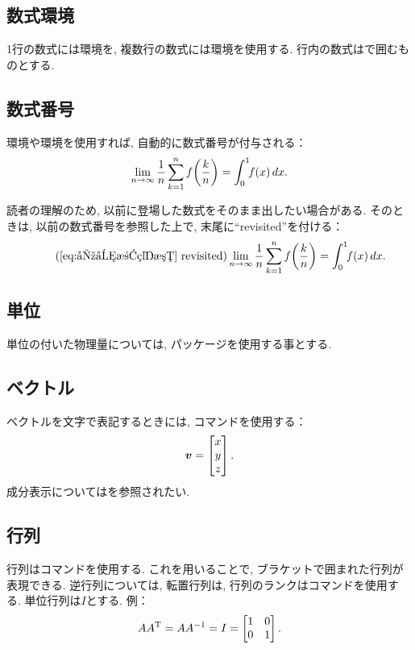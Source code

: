 \documentclass[uplatex,a4j,twocolumn]{jsarticle}
\begin{document}
	\subsection{数式環境}
		1行の数式には環境を, 複数行の数式には環境を使用する. 行内の数式は\code{\$}で囲むものとする.
	\subsection{数式番号}
		環境や環境を使用すれば, 自動的に数式番号が付与される：
		\begin{equation}\label{eq:区分求積法}
			\lim\limits_{n\to\infty}{\frac{1}{n} \sum_{k=1}^{n}{f\pr{\frac{k}{n}}}} = \dint{x}{0}{1}{f\pr{x}}.
		\end{equation}
		
		読者の理解のため, 以前に登場した数式をそのまま出したい場合がある. そのときは, 以前の数式番号を参照した上で, 末尾に``revisited''を付ける：
		\begin{equation}\tag{\ref{eq:区分求積法} revisited}
			\lim\limits_{n\to\infty}{\frac{1}{n} \sum_{k=1}^{n}{f\pr{\frac{k}{n}}}} = \dint{x}{0}{1}{f\pr{x}}.
		\end{equation}
	\subsection{単位}
		単位の付いた物理量については, パッケージを使用する事とする.
	\subsection{ベクトル}
		ベクトルを文字で表記するときには, コマンドを使用する：
		\begin{equation}
			\bm{v} = \batrix{x \\ y \\ z}.
		\end{equation}
		成分表示についてはを参照されたい.
	\subsection{行列}
		行列はコマンドを使用する. これを用いることで, ブラケットで囲まれた行列が表現できる. 逆行列については, 転置行列は, 行列のランクはコマンドを使用する. 単位行列は$I$とする. 例：
		\begin{equation}
			A \tr{A} = A \inv{A} = I = \batrix{1 & 0 \\ 0 & 1}.
		\end{equation}
		
\end{document}
